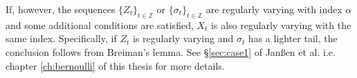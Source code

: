 If, however, the sequences $\{Z_t\}_{t \in \mathbb Z}$ or
$\{\sigma_t\}_{t \in \mathbb Z}$ are regularly varying with index
$\alpha$ and some additional conditions are satisfied, $X_t$ is also
regularly varying with the same index. Specifically, if $Z_t$ is
regularly varying and $\sigma_t$ has a lighter tail, the conclusion
follows from Breiman's lemma. See \S\ref{sec:case1} of Jan\ss en et
al. i.e. chapter \ref{ch:bernoulli} of this thesis for more details.


